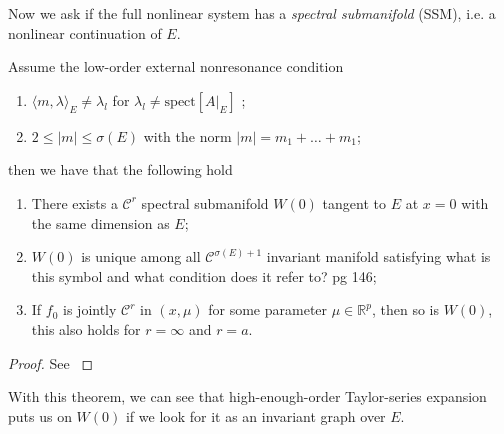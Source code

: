 Now we ask if the full nonlinear system has a \emph{spectral submanifold} (SSM), i.e. a nonlinear continuation of $E$.
\begin{theorem}[]
Assume the low-order external nonresonance condition
\begin{enumerate}
	\item $\langle m, \lambda \rangle_{E} \neq \lambda _l$ for $\lambda_l \neq  \textrm{spect}[A|_{E}] $ ;
	\item $2 \leq |m| \leq \sigma(E)$ with the norm $|m | =m_1 + \ldots + m_1$;
\end{enumerate}
then we have that the following hold
\begin{enumerate}
	\item There exists a $\mathcal{C}^{r}$ spectral submanifold $W(0)$ tangent to $E$ at $x=0$ with the same dimension as $E$;
	\item $W(0)$ is unique among all $\mathcal{C}^{\sigma(E) + 1}$ invariant manifold satisfying {\color{blue} what is this symbol and what condition does it refer to? pg 146};
	\item If $f_0$ is jointly $\mathcal{C}^{r}$ in $(x,\mu )$ for some parameter $\mu \in \mathbb{R}^{p}$, then so is $W(0)$, this also holds for $r=\infty $ and $r=a$. 
\end{enumerate}
\end{theorem}
\begin{proof}
	See \cite{Ponsioen2016}
\end{proof}
 
With this theorem, we can see that high-enough-order Taylor-series expansion puts us on $W(0)$ if we look for it as an invariant graph over $E$.



